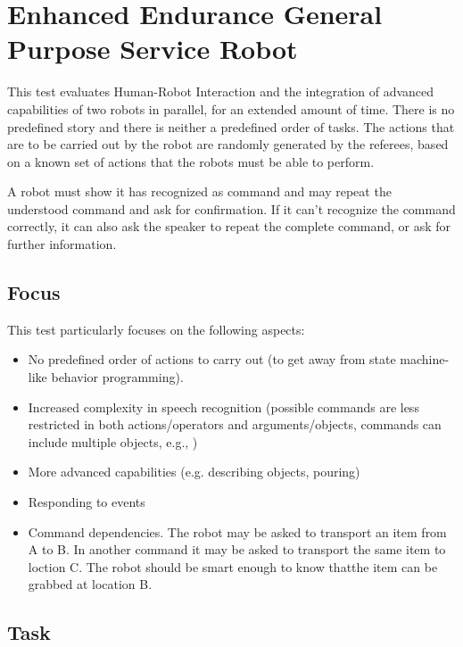 \section{Enhanced Endurance General Purpose Service Robot}

This test evaluates Human-Robot Interaction and the integration of advanced capabilities of two robots in parallel, for an extended amount of time. 
There is no predefined story and there is neither a predefined order of tasks. 
The actions that are to be carried out by the robot are randomly generated by the referees, 
  based on a known set of actions that the robots must be able to perform.

A robot must show it has recognized as command and may repeat the understood command and ask for confirmation. 
If it can't recognize the command correctly, it can also ask the speaker to repeat the complete command, or ask for further information.

\subsection{Focus}
This test particularly focuses on the following aspects:
\begin{itemize}
	\item No predefined order of actions to carry out (to get away from state machine-like behavior programming).
	\item Increased complexity in speech recognition (possible commands are less restricted in both actions/operators and arguments/objects, 
	  commands can include multiple objects, e.g., )
	\item More advanced capabilities (e.g. describing objects, pouring)
	\item Responding to events
	\item Command dependencies. The robot may be asked to transport an item from A to B. 
	  In another command it may be asked to transport the same item to loction C. 
	  The robot should be smart enough to know thatthe item can be grabbed at location B.
\end{itemize}

\subsection{Task}

